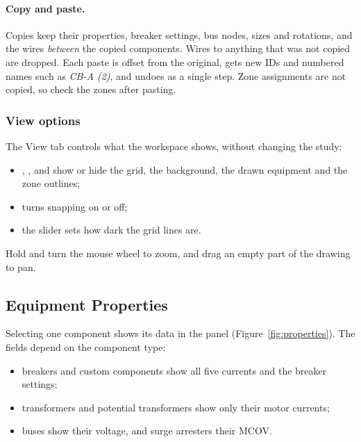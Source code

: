 \paragraph{Copy and paste.} Copies keep their properties, breaker settings, bus nodes,
sizes and rotations, and the wires \emph{between} the copied components. Wires to
anything that was not copied are dropped. Each paste is offset from the original, gets
new IDs and numbered names such as \emph{CB-A (2)}, and undoes as a single step. Zone
assignments are not copied, so check the zones after pasting.

\subsubsection{View options}

The View tab controls what the workspace shows, without changing the study:
\begin{itemize}
  \item {}, ,  and  show or
        hide the grid, the background, the drawn equipment and the zone outlines;
  \item {} turns snapping on or off;
  \item the  slider sets how dark the grid lines are.
\end{itemize}
Hold  and turn the mouse wheel to zoom, and drag an empty part of the
drawing to pan.

\subsection{Equipment Properties}\label{sec:properties}

Selecting one component shows its data in the  panel
(Figure~\ref{fig:properties}). The fields depend on the component type:
\begin{itemize}
  \item breakers and custom components show all five currents and the breaker settings;
  \item transformers and potential transformers show only their motor currents;
  \item buses show their voltage, and surge arresters their MCOV.
\end{itemize}

